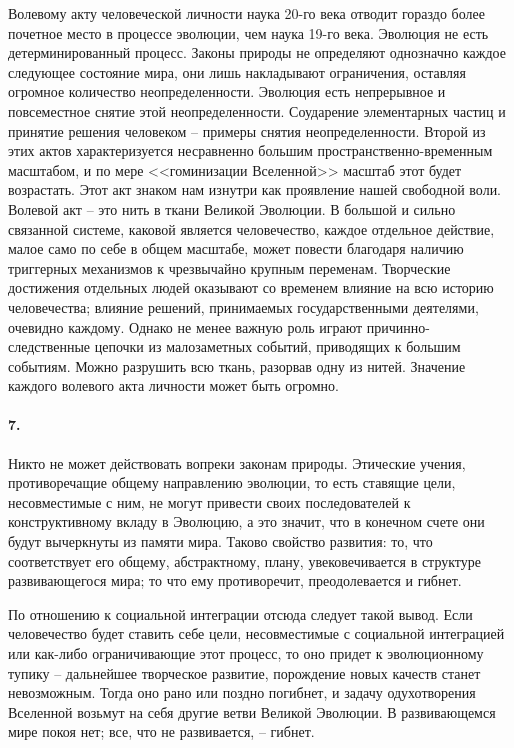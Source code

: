 \documentclass{book}
\begin{document}
Волевому акту человеческой личности наука 20-го века отводит гораздо более почетное место в процессе эволюции, чем наука 19-го века. Эволюция не есть детерминированный процесс. Законы природы не определяют однозначно каждое следующее состояние мира, они лишь накладывают ограничения, оставляя огромное количество неопределенности. Эволюция есть непрерывное и повсеместное снятие этой неопределенности. Соударение элементарных частиц и принятие решения человеком -- примеры снятия неопределенности. Второй из этих актов характеризуется несравненно большим пространственно-временным масштабом, и по мере <<гоминизации Вселенной>> масштаб этот будет возрастать. Этот акт знаком нам изнутри как проявление нашей свободной воли. Волевой акт -- это нить в ткани Великой Эволюции. В большой и сильно связанной системе, каковой является человечество, каждое отдельное действие, малое само по себе в общем масштабе, может повести благодаря наличию триггерных механизмов к чрезвычайно крупным переменам. Творческие достижения отдельных 
людей оказывают со временем влияние на всю историю человечества; влияние решений, принимаемых государственными деятелями, очевидно каждому. Однако не менее важную роль играют причинно-следственные цепочки из малозаметных событий, приводящих к большим событиям. Можно разрушить всю ткань, разорвав одну из нитей. Значение каждого волевого акта личности может быть огромно.

\paragraph{7.} Никто не может действовать вопреки законам природы. Этические учения, противоречащие общему направлению эволюции, то есть ставящие цели, несовместимые с ним, не могут привести своих последователей к конструктивному вкладу в Эволюцию, а это значит, что в конечном счете они будут вычеркнуты из памяти мира. Таково свойство развития: то, что соответствует его общему, абстрактному, плану, увековечивается в структуре развивающегося мира; то что ему противоречит, преодолевается и гибнет.

По отношению к социальной интеграции отсюда следует такой вывод. Если человечество будет ставить себе цели, несовместимые с социальной интеграцией или как-либо ограничивающие этот процесс, то оно придет к эволюционному тупику -- дальнейшее творческое развитие, порождение новых качеств станет невозможным. Тогда оно рано или поздно погибнет, и задачу одухотворения Вселенной возьмут на себя другие ветви Великой Эволюции. В развивающемся мире покоя нет; все, что не развивается, -- гибнет.
\end{document}

